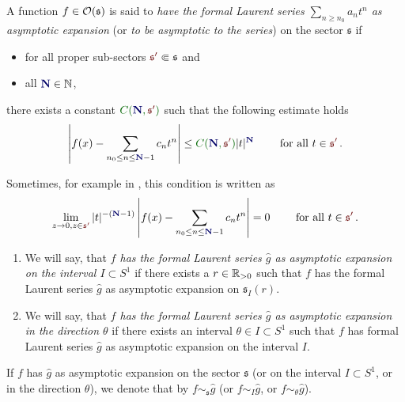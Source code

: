 \begin{defn}
  \def\myN{\textbf{\textcolor{blue!40!black}{N}}}
  \def\mySect{\textcolor{red!40!black}{\mathfrak{s}'}}
  \def\myConst{\textcolor{green!40!black}{C(\myN,\mySect)}}
  A function $f\in\mathcal{O}(\mathfrak{s})$ is said to \emph{have the formal Laurent
  series $\sum_{n\geq n_0}a_nt^n$ as asymptotic expansion} (or \emph{to be
  asymptotic to the series}) on the sector $\mathfrak{s}$ if
  \begin{itemize}
    \item for all proper sub-sectors $\mySect\Subset\mathfrak{s}$ and
    \item all $\myN\in\N$,
  \end{itemize}
  there exists a constant
  $\myConst$ such that the following estimate holds
  \[
    \left|
      f(x)-\sum_{n_0\leq n\leq \myN-1}c_nt^n
    \right|
    \leq \myConst|t|^{\myN} \qquad \text{ for all }t\in \mySect \,.
  \]
  \begin{rem}
    Sometimes, for example in \cite{sabbah_cimpa90}, this condition is written
    as
    \[
      \lim_{z\to0,z\in{\mySect}}
      |t|^{-(\myN-1)}
      \left|
        f(x)-\sum_{n_0\leq n\leq \myN-1}c_nt^n
      \right|=0
      \qquad \text{ for all } t\in \mySect \,.
    \]
  \end{rem}
  \begin{enumerate}
    \item We will say, that \emph{$f$ has the formal Laurent series $\hat g$ as
      asymptotic expansion on the interval $I\subset S^1$} if there exists a
      $r\in\mathbb{R}_{>0}$ such that $f$ has the formal Laurent series $\hat g$ as
      asymptotic expansion on $\mathfrak{s}_I(r)$.
    \item We will say, that \emph{$f$ has the formal Laurent series $\hat g$ as
      asymptotic expansion in the direction $\theta$} if there exists an
      interval $\theta\in I\subset S^1$ such that $f$ has formal Laurent series
      $\hat g$ as asymptotic expansion on the interval $I$.
  \end{enumerate}
\end{defn}
If $f$ has $\hat g$ as asymptotic expansion on the sector $\mathfrak{s}$ (or on
the interval $I\subset S^1$, or in the direction $\theta$), we denote that by
$f\sim_{\mathfrak{s}}\hat g$ (or $f\sim_{I}\hat g$, or $f\sim_{\theta}\hat g$).
